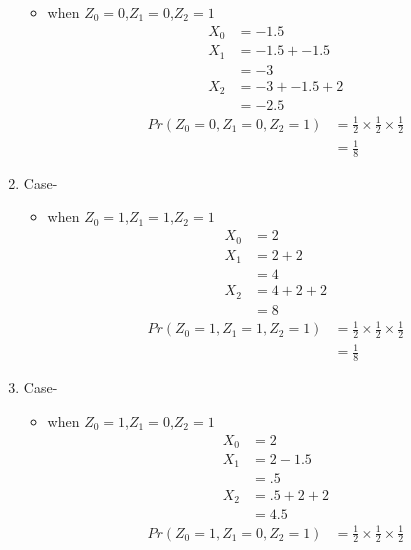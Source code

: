 \documentclass[11pt,a4paper,twocolumn]{article}
\begin{document}
\begin{enumerate}
\begin{itemize}
        \item when $Z_{0}=0$,$Z_{1}=0$,$Z_{2}=1$\\
        \begin{align*}
            X_{0}&=-1.5\\
            X_{1}&=-1.5+-1.5\\
            &=-3\\
            X_{2}&=-3+-1.5+2\\
            &=-2.5
        \end{align*}
        \begin{align*}
            Pr(Z_{0}=0,Z_{1}=0,Z_{2}=1)&=\frac{1}{2}\times\frac{1}{2}\times\frac{1}{2}\\
            &=\frac{1}{8}
        \end{align*}
    \end{itemize}
    \item Case-
    \begin{itemize}
        \item when $Z_{0}=1$,$Z_{1}=1$,$Z_{2}=1$\\
        \begin{align*}
            X_{0}&=2\\
            X_{1}&=2+2\\
            &=4\\
            X_{2}&=4+2+2\\
            &=8
        \end{align*}
        \begin{align*}
            Pr(Z_{0}=1,Z_{1}=1,Z_{2}=1)&=\frac{1}{2}\times\frac{1}{2}\times\frac{1}{2}\\
            &=\frac{1}{8}
        \end{align*}
    \end{itemize}
     \item Case-
    \begin{itemize}
        \item when $Z_{0}=1$,$Z_{1}=0$,$Z_{2}=1$\\
        \begin{align*}
            X_{0}&=2\\
            X_{1}&=2-1.5\\
            &=.5\\
            X_{2}&=.5+2+2\\
            &=4.5
        \end{align*}
        \begin{align*}
            Pr(Z_{0}=1,Z_{1}=0,Z_{2}=1)&=\frac{1}{2}\times\frac{1}{2}\times\frac{1}{2}\\

\end{align*}
\end{itemize}
\end{enumerate}
\end{document}
